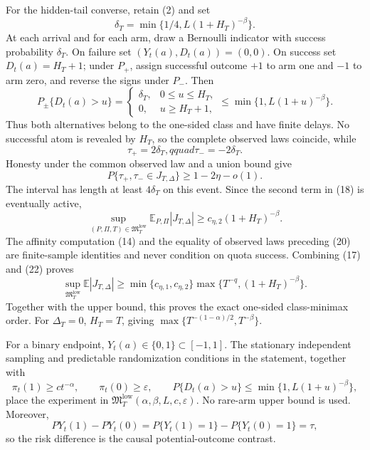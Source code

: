 For the hidden-tail converse, retain (2) and set
\[
 \delta_T=\min\{1/4,L(1+H_T)^{-\beta}\}. \tag{18}
\]
At each arrival and for each arm, draw a Bernoulli indicator with success probability \(\delta_T\).  On failure set \((Y_t(a),D_t(a))=(0,0)\).  On success set \(D_t(a)=H_T+1\); under \(P_+\), assign successful outcome \(+1\) to arm one and \(-1\) to arm zero, and reverse the signs under \(P_-\).  Then
\[
 P_\pm\{D_t(a)>u\}=
 \begin{cases}
 \delta_T,&0\leq u\leq H_T,\\
 0,&u\geq H_T+1,
 \end{cases}
 \leq\min\{1,L(1+u)^{-\beta}\}. \tag{19}
\]
Thus both alternatives belong to the one-sided class and have finite delays.  No successful atom is revealed by \(H_T\), so the complete observed laws coincide, while
\[
 \tau_+=2\delta_T,qquad \tau_-=-2\delta_T. \tag{20}
\]
Honesty under the common observed law and a union bound give
\[
 P\{\tau_+,\tau_-\in J_{T,\Delta}\}\geq1-2\eta-o(1). \tag{21}
\]
The interval has length at least \(4\delta_T\) on this event.  Since the second term in (18) is eventually active,
\[
 \sup_{(P,\Pi,T)\in\mathfrak M_T^{\mathrm{low}}}
 \mathbb E_{P,\Pi}|J_{T,\Delta}|
 \geq c_{\eta,2}(1+H_T)^{-\beta}. \tag{22}
\]
The affinity computation (14) and the equality of observed laws preceding (20) are finite-sample identities and never condition on quota success.  Combining (17) and (22) proves
\[
 \sup_{\mathfrak M_T^{\mathrm{low}}}\mathbb E|J_{T,\Delta}|
 \geq\min\{c_{\eta,1},c_{\eta,2}\}
 \max\{T^{-q},(1+H_T)^{-\beta}\}. \tag{23}
\]
Together with the upper bound, this proves the exact one-sided class-minimax order.  For \(\Delta_T=0\), \(H_T=T\), giving \(\max\{T^{-(1-\alpha)/2},T^{-\beta}\}\).

For a binary endpoint, \(Y_t(a)\in\{0,1\}\subset[-1,1]\).  The stationary independent sampling and predictable randomization conditions in the statement, together with
\[
 \pi_t(1)\geq ct^{-\alpha},\qquad \pi_t(0)\geq\varepsilon,
 \qquad P\{D_t(a)>u\}\leq\min\{1,L(1+u)^{-\beta}\}, \tag{1}
\]
place the experiment in \(\mathfrak M_T^{\mathrm{low}}(\alpha,\beta,L,c,\varepsilon)\).  No rare-arm upper bound is used.  Moreover,
\[
 PY_t(1)-PY_t(0)=P\{Y_t(1)=1\}-P\{Y_t(0)=1\}=\tau, \tag{2}
\]
so the risk difference is the causal potential-outcome contrast.

